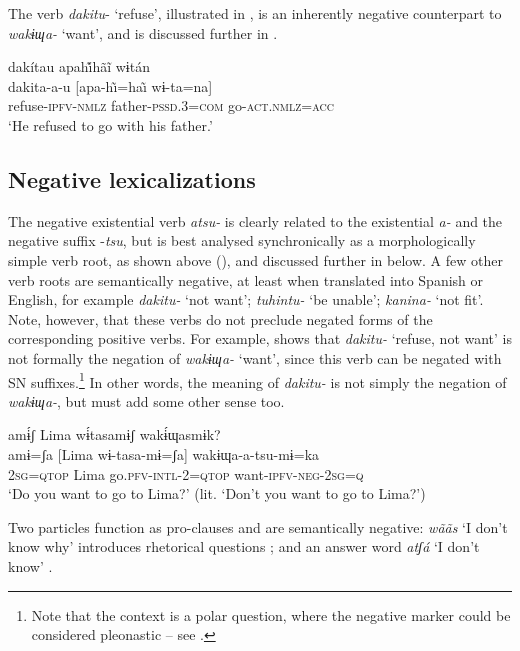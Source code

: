 \documentclass[output=paper,colorlinks,citecolor=brown,draft]{langscibook}
\begin{document}
The verb \textit{dakitu}{}- ‘refuse’, illustrated in , is an inherently negative counterpart to \textit{wakɨɰa-} ‘want’, and is discussed further in .

\ea\label{ex:agu:40}
    \glll dakítau apahı̃́hãĩ wɨtán\\ 
          dakita-a-u  [apa-h\~\i=ha\~\i{}  wɨ-ta=na] \\
          refuse-\textsc{ipfv-nmlz}  father-\textsc{pssd.3=com}  go-\textsc{act.nmlz=acc} \\
    \glt ‘He refused to go with his father.’ \citep[530]{Overall2017a}
\z 

\subsection{Negative lexicalizations}\label{sec:agu:2.5}

The negative existential verb \textit{atsu-} is clearly related to the existential \textit{a-} and the negative suffix \nobreakdash-\textit{tsu}, but is best analysed synchronically as a morphologically simple verb root, as shown above (), and discussed further in  below. A few other verb roots are semantically negative, at least when translated into Spanish or English, for example \textit{dakitu-} ‘not want’; \textit{tuhintu-} ‘be unable’;  \textit{kanina-} ‘not fit’. Note, however, that these verbs do not preclude negated forms of the corresponding positive verbs. For example,  shows that \textit{dakitu-} ‘refuse, not want’ is not formally the negation of \textit{wakɨɰa-} ‘want’, since this verb can be negated with SN suffixes.\footnote{Note that the context is a polar question, where the negative marker could be considered pleonastic – see .} In other words, the meaning of \textit{dakitu-} is not simply the negation of \textit{wakɨɰa-}, but must add some other sense too.

\ea\label{ex:agu:41}
    \glll amɨ́ʃ Lima wɨ́tasamɨʃ wakɨ́ɰasmɨk? \\ 
          amɨ=ʃa  [Lima  wɨ-tasa-mɨ=ʃa]  wakɨɰa-a-tsu-mɨ=ka \\
          \textsc{2sg}=\textsc{qtop}  Lima  go.\textsc{pfv-intl-2=qtop}  want\textsc{{}-ipfv-neg-2sg=q} \\
    \glt ‘Do you want to go to Lima?’ (lit. ‘Don’t you want to go to Lima?’) \citep[480]{Overall2017a}
\z 

Two particles function as pro-clauses and are semantically negative: \textit{wããs} ‘I don’t know why’ introduces rhetorical questions ; and an answer word \textit{atʃá} ‘I don’t know’ \citep[409]{Overall2017a}.
\end{document}
